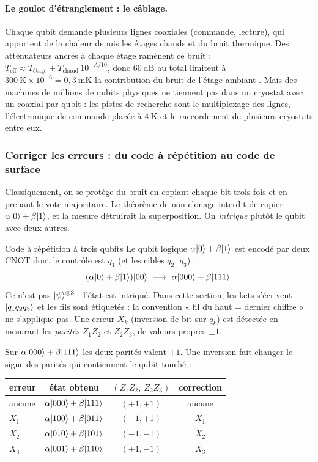 \paragraph{Le goulot d'étranglement : le câblage.} Chaque qubit demande plusieurs lignes coaxiales (commande, lecture),
qui apportent de la chaleur depuis les étages chauds et du bruit thermique. Des atténuateurs ancrés à chaque étage
ramènent ce bruit : $T_{\mathrm{eff}}\approx T_{\text{étage}}+T_{\text{chaud}}\,10^{-A/10}$, donc $60\ \mathrm{dB}$ au total limitent à
$300\ \mathrm{K}\times10^{-6}=0{,}3\ \mathrm{mK}$ la contribution du bruit de l'étage ambiant \parencite{krinner2019}. Mais des machines de millions de
qubits physiques ne tiennent pas dans un cryostat avec un coaxial par qubit : les pistes de recherche sont le multiplexage des lignes,
l'électronique de commande placée à $4\ \mathrm{K}$ et le raccordement de plusieurs cryostats entre eux.

\subsubsection{Corriger les erreurs : du code à répétition au code de surface}

Classiquement, on se protège du bruit en copiant chaque bit trois fois et en prenant le vote majoritaire. Le théorème de
non-clonage interdit de copier $\alpha|0\rangle+\beta|1\rangle$, et la mesure détruirait la superposition. On \emph{intrique} plutôt
le qubit avec deux autres.

\begin{definition}{Code à répétition à trois qubits}
Le qubit logique $\alpha|0\rangle+\beta|1\rangle$ est encodé par deux CNOT dont le contrôle est $q_1$ (et les cibles $q_2$, $q_3$) :
\[
  (\alpha\ket0+\beta\ket1)\ket{00}\ \longmapsto\ \alpha\ket{000}+\beta\ket{111}.
\]
Ce n'est pas $|\psi\rangle^{\otimes3}$ : l'état est intriqué. Dans cette section, les kets s'écrivent $|q_1q_2q_3\rangle$ et les
fils sont étiquetés : la convention « fil du haut = dernier chiffre » ne s'applique pas. Une erreur $X_k$ (inversion de bit sur $q_k$) est détectée en mesurant les
\emph{parités} $Z_1Z_2$ et $Z_2Z_3$, de valeurs propres $\pm1$.
\end{definition}

Sur $\alpha|000\rangle+\beta|111\rangle$ les deux parités valent $+1$. Une inversion fait changer le signe des parités qui contiennent le qubit touché :

\begin{center}
\renewcommand{\arraystretch}{1.15}
\begin{tabular}{@{}lccc@{}}
\toprule
erreur & état obtenu & $(Z_1Z_2,\ Z_2Z_3)$ & correction\\
\midrule
aucune & $\alpha|000\rangle+\beta|111\rangle$ & $(+1,+1)$ & aucune\\
$X_1$ & $\alpha|100\rangle+\beta|011\rangle$ & $(-1,+1)$ & $X_1$\\
$X_2$ & $\alpha|010\rangle+\beta|101\rangle$ & $(-1,-1)$ & $X_2$\\
$X_3$ & $\alpha|001\rangle+\beta|110\rangle$ & $(+1,-1)$ & $X_3$\\
\bottomrule
\end{tabular}
\end{center}

